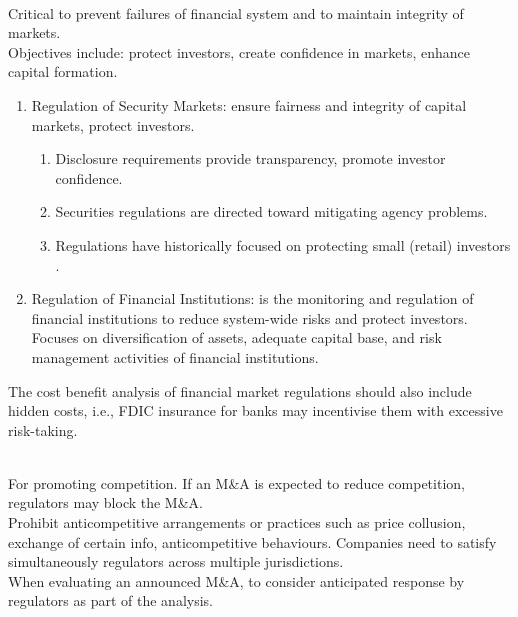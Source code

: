 \begin{remark} \\
Critical to prevent failures of financial system and to maintain integrity of markets.\\
Objectives include: protect investors, create confidence in markets, enhance capital formation.
\begin{enumerate}[label=\roman*.]
\setlength{\itemsep}{0pt}
\item Regulation of Security Markets: ensure fairness and integrity of capital markets, protect investors.
\begin{enumerate}[label=\arabic*.]
\setlength{\itemsep}{0pt}
\item Disclosure requirements provide transparency, promote investor confidence.
\item Securities regulations are directed toward mitigating agency problems.
\item Regulations have historically focused on protecting small (retail) investors .
\end{enumerate}
\item Regulation of Financial Institutions:  is the monitoring and regulation of financial institutions to reduce system-wide risks and protect investors. Focuses on diversification of assets, adequate capital base, and risk management activities of financial institutions.
\end{enumerate}
The cost benefit analysis of financial market regulations should also include hidden costs, i.e., FDIC insurance for banks may incentivise them with excessive risk-taking.
\end{remark}

\begin{remark} \\
For promoting competition. If an M\&A is expected to reduce competition, regulators may block the M\&A.\\
Prohibit anticompetitive arrangements or practices such as price collusion, exchange of certain info, anticompetitive behaviours.
Companies need to satisfy simultaneously regulators across multiple jurisdictions.\\
When evaluating an announced M\&A, to consider anticipated response by regulators as part of the analysis.
\end{remark}

